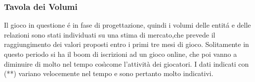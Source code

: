

\subsubsection{Tavola dei Volumi}

Il gioco in questione \'{e} in fase di progettazione, quindi i volumi delle entit\'{a} e delle relazioni sono stati individuati su una stima di mercato,che prevede il raggiungimento dei valori proposti entro i primi tre mesi di gioco. Solitamente in questo periodo si ha il boom di iscrizioni ad un gioco online, che poi vanno a diminuire di molto nel tempo cos\`{\i}come l'attività dei giocatori. I dati indicati con (**) variano velocemente nel tempo e sono pertanto molto indicativi. 

\begin{table}[H]
\centering


\end{table}
